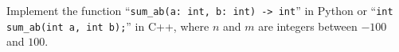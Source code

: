 Implement the function ``\texttt{sum_ab(a: int, b: int) -> int}'' in Python or ``\texttt{int sum_ab(int a, int b);}'' in C++, where $n$ and $m$ are integers between $-100$ and $100$.
